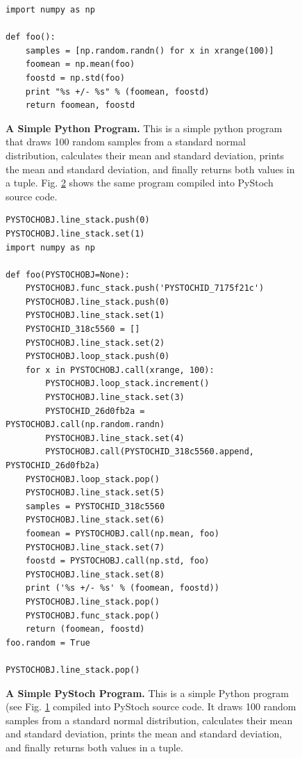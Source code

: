 \documentclass[12pt,letterpaper]{article}
\begin{document}
\begin{figure}
\begin{verbatim}
import numpy as np

def foo():
    samples = [np.random.randn() for x in xrange(100)]
    foomean = np.mean(foo)
    foostd = np.std(foo)
    print "%s +/- %s" % (foomean, foostd)
    return foomean, foostd
\end{verbatim}
\caption{\small\textbf{A Simple Python Program.}  This is a simple
  python program that draws 100 random samples from a standard normal
  distribution, calculates their mean and standard deviation, prints
  the mean and standard deviation, and finally returns both values in
  a tuple.  Fig. \ref{fig:compiled} shows the same program compiled
  into PyStoch source code.}
\label{fig:source}
\end{figure}

\begin{figure}
\begin{verbatim}
PYSTOCHOBJ.line_stack.push(0)
PYSTOCHOBJ.line_stack.set(1)
import numpy as np

def foo(PYSTOCHOBJ=None):
    PYSTOCHOBJ.func_stack.push('PYSTOCHID_7175f21c')
    PYSTOCHOBJ.line_stack.push(0)
    PYSTOCHOBJ.line_stack.set(1)
    PYSTOCHID_318c5560 = []
    PYSTOCHOBJ.line_stack.set(2)
    PYSTOCHOBJ.loop_stack.push(0)
    for x in PYSTOCHOBJ.call(xrange, 100):
        PYSTOCHOBJ.loop_stack.increment()
        PYSTOCHOBJ.line_stack.set(3)
        PYSTOCHID_26d0fb2a = PYSTOCHOBJ.call(np.random.randn)
        PYSTOCHOBJ.line_stack.set(4)
        PYSTOCHOBJ.call(PYSTOCHID_318c5560.append, PYSTOCHID_26d0fb2a)
    PYSTOCHOBJ.loop_stack.pop()
    PYSTOCHOBJ.line_stack.set(5)
    samples = PYSTOCHID_318c5560
    PYSTOCHOBJ.line_stack.set(6)
    foomean = PYSTOCHOBJ.call(np.mean, foo)
    PYSTOCHOBJ.line_stack.set(7)
    foostd = PYSTOCHOBJ.call(np.std, foo)
    PYSTOCHOBJ.line_stack.set(8)
    print ('%s +/- %s' % (foomean, foostd))
    PYSTOCHOBJ.line_stack.pop()
    PYSTOCHOBJ.func_stack.pop()
    return (foomean, foostd)
foo.random = True

PYSTOCHOBJ.line_stack.pop()
\end{verbatim}
\caption{\small\textbf{A Simple PyStoch Program.}  This is a simple
  Python program (see Fig. \ref{fig:source} compiled into PyStoch
  source code.  It draws 100 random samples from a standard normal
  distribution, calculates their mean and standard deviation, prints
  the mean and standard deviation, and finally returns both values in
  a tuple.}
\label{fig:compiled}
\end{figure}
\end{document}
